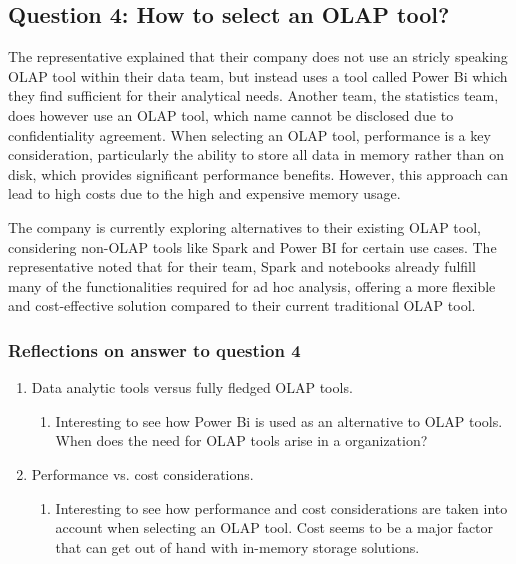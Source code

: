 \subsection{Question 4: How to select an OLAP tool?}

The representative explained that their company does not use an stricly speaking OLAP tool within their data team, but instead uses a tool called Power Bi which they find sufficient for their analytical needs. 
Another team, the statistics team, does however use an OLAP tool, which name cannot be disclosed due to confidentiality agreement. 
When selecting an OLAP tool, performance is a key consideration, particularly the ability to store all data in memory rather than on disk, which 
provides significant performance benefits. However, this approach can lead to high costs due to the high and expensive memory usage.

The company is currently exploring alternatives to their existing OLAP tool, considering non-OLAP tools like Spark and Power BI for certain use cases. 
The representative noted that for their team, Spark and notebooks already fulfill many of the functionalities required for ad hoc analysis, 
offering a more flexible and cost-effective solution compared to their current traditional OLAP tool.

\subsubsection{Reflections on answer to question 4}
\begin{enumerate}
    \item Data analytic tools versus fully fledged OLAP tools.
    \begin{enumerate}
        \item Interesting to see how Power Bi is used as an alternative to OLAP tools. When does the need for OLAP tools arise in a organization?
    \end{enumerate}
    \item Performance vs. cost considerations.
    \begin{enumerate}
        \item Interesting to see how performance and cost considerations are taken into account when selecting an OLAP tool. Cost seems to be a major factor that can get out of hand with in-memory storage solutions.
    \end{enumerate}
\end{enumerate}





